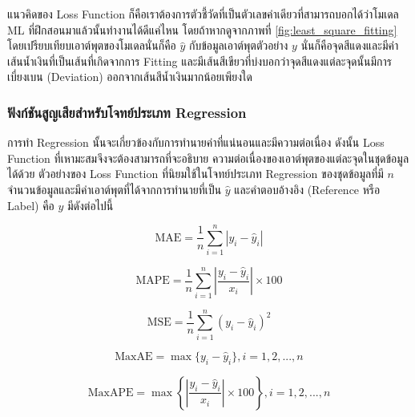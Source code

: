 แนวคิดของ Loss Function ก็คือเราต้องการตัวชี้วัดที่เป็นตัวเลขค่าเดียวที่สามารถบอกได้ว่าโมเดล ML ที่ฝึกสอนมาแล้วนั้นทำงานได้ดีแค่ไหน
โดยถ้าหากดูจากภาพที่ \ref{fig:least_square_fitting} โดยเปรียบเทียบเอาต์พุตของโมเดลนั่นก็คือ $\hat{y}$ กับข้อมูลเอาต์พุตตัวอย่าง
$y$ นั่นก็คือจุดสีแดงและมีค่าเส้นน้ำเงินที่เป็นเส้นที่เกิดจากการ Fitting และมีเส้นสีเขียวที่บ่งบอกว่าจุดสีแดงแต่ละจุดนั้นมีการเบี่ยงเบน (Deviation)
ออกจากเส้นสีน้ำเงินมากน้อยเพียงใด

\subsubsection{ฟังก์ชันสูญเสียสำหรับโจทย์ประเภท Regression}
\label{sssec:loss_func_reg}

การทำ Regression นั้นจะเกี่ยวข้องกับการทำนายค่าที่แน่นอนและมีความต่อเนื่อง ดังนั้น Loss Function ที่เหามะสมจึงจะต้องสามารถที่จะอธิบาย%
ความต่อเนื่องของเอาต์พุตของแต่ละจุดในชุดข้อมูลได้ด้วย ตัวอย่างของ Loss Function ที่นิยมใช้ในโจทย์ประเภท Regression ของชุดข้อมูลที่มี
$n$ จำนวนข้อมูลและมีค่าเอาต์พุตที่ได้จากการทำนายที่เป็น $\hat{y}$ และคำตอบอ้างอิง (Reference หรือ Label) คือ $y$ มีดังต่อไปนี้

\begin{equation}\label{eq:mae}
    \text{MAE} = \frac{1}{n} \sum_{i=1}^{n} | y_{i} - \hat{y}_{i} |
\end{equation}

\begin{equation}\label{eq:mape}
    \text{MAPE} = \frac{1}{n} \sum_{i=1}^{n} \left| \frac{y_{i} - \hat{y}_{i}}{x_{i}} \right| \times 100
\end{equation}

\begin{equation}\label{eq:mse}
    \text{MSE} = \frac{1}{n} \sum_{i=1}^{n} \left( y_{i} - \hat{y}_{i} \right)^2
\end{equation}

\begin{equation}\label{eq:maxae}
    \text{MaxAE} = \max\{y_{i} - \hat{y}_{i}\}, i = 1, 2, ..., n
\end{equation}

\begin{equation}\label{eq:maxape}
    \text{MaxAPE} = \max\left\{\left| \frac{y_{i} - \hat{y}_{i}}{x_{i}} \right| \times 100 \right\}, i = 1, 2,
    ..., n
\end{equation}

